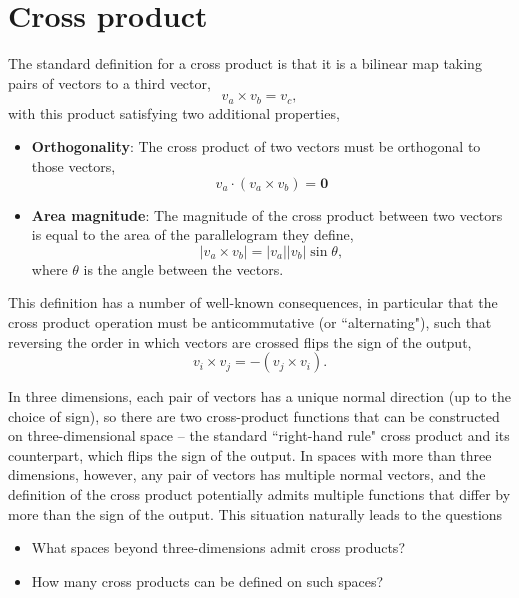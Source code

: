 \documentclass[11pt]{article}
\newcommand{\vc}[1][]{v_{#1}}
\newcommand{\norm}[1]{\left|#1\right|}
\begin{document}
\clearpage
\section{Cross product}

The standard definition for a cross product is that it is a bilinear map taking pairs of vectors to a third vector, 
\begin{equation}
\vc[a] \times \vc[b] = \vc[c],
\end{equation}
with this product satisfying two additional properties,
\begin{itemize}
\item \textbf{Orthogonality}: The cross product of two vectors must be orthogonal to those vectors,
\begin{equation}
\vc[a] \cdot (\vc[a]\times\vc[b]) = \mathbf{0}
\end{equation}
\item \textbf{Area magnitude}: The magnitude of the cross product between two vectors is equal to the area of the parallelogram they define,
\begin{equation}
\norm{\vc[a]\times\vc[b]} = \norm{\vc[a]}\norm{\vc[b]}\sin\theta,
\end{equation}
where $\theta$ is the angle between the vectors.
\end{itemize}
This definition has a number of well-known consequences, in particular 
that the cross product operation must be anticommutative (or ``alternating"), such that reversing the order in which vectors are crossed flips the sign of the output,
\begin{equation}
\vc[i]\times\vc[j] = -(\vc[j]\times\vc[i]).
\end{equation}

In three dimensions, each pair of vectors has a unique normal direction (up to the choice of sign), so there are two cross-product functions that can be constructed on three-dimensional space -- the standard ``right-hand rule" cross product and its counterpart, which flips the sign of the output. In spaces with more than three dimensions, however, any pair of vectors has multiple normal vectors, and the definition of the cross product potentially admits multiple functions that differ by more than the sign of the output. This situation naturally leads to the questions
\begin{itemize}
\item What spaces beyond three-dimensions admit cross products?
\item How many cross products can be defined on such spaces?
\end{itemize}
\end{document}
